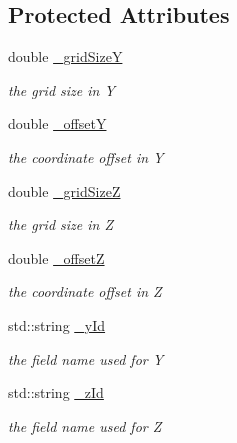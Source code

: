 \subsection*{Protected Attributes}
\begin{DoxyCompactItemize}
\item 
double \hyperlink{class_d_d4hep_1_1_d_d_segmentation_1_1_cartesian_grid_y_z_ac1bd277d62423bb439394096d82a0ea4}{\_\-gridSizeY}
\begin{DoxyCompactList}\small\item\em the grid size in Y \item\end{DoxyCompactList}\item 
double \hyperlink{class_d_d4hep_1_1_d_d_segmentation_1_1_cartesian_grid_y_z_aeb373831f13b0bf9ca5d534b7551cf50}{\_\-offsetY}
\begin{DoxyCompactList}\small\item\em the coordinate offset in Y \item\end{DoxyCompactList}\item 
double \hyperlink{class_d_d4hep_1_1_d_d_segmentation_1_1_cartesian_grid_y_z_a4584ea29126b00ef60c8a75eeda06028}{\_\-gridSizeZ}
\begin{DoxyCompactList}\small\item\em the grid size in Z \item\end{DoxyCompactList}\item 
double \hyperlink{class_d_d4hep_1_1_d_d_segmentation_1_1_cartesian_grid_y_z_a4cd904d09e43a33180ef8c0951c99cc7}{\_\-offsetZ}
\begin{DoxyCompactList}\small\item\em the coordinate offset in Z \item\end{DoxyCompactList}\item 
std::string \hyperlink{class_d_d4hep_1_1_d_d_segmentation_1_1_cartesian_grid_y_z_ad7b9edca36f4b35162b3b49b3763e245}{\_\-yId}
\begin{DoxyCompactList}\small\item\em the field name used for Y \item\end{DoxyCompactList}\item 
std::string \hyperlink{class_d_d4hep_1_1_d_d_segmentation_1_1_cartesian_grid_y_z_ad2f85ca98f4c77d7dcad2f949b8ea7e1}{\_\-zId}
\begin{DoxyCompactList}\small\item\em the field name used for Z \item\end{DoxyCompactList}\end{DoxyCompactItemize}


